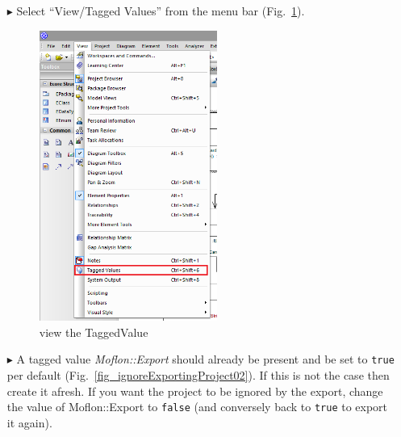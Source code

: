 \begin{enumerate}
\item[$\blacktriangleright$]Select ``View/Tagged Values'' from the menu bar (Fig.~\ref{fig_ignoreExportingProject01}).
\begin{figure}[htbp]
\begin{center}  \includegraphics[width=0.55\textwidth]{ignoreExportingProject1}
  \caption{view the TaggedValue}  
  \label{fig_ignoreExportingProject01}
\end{center}
\end{figure} 

\item[$\blacktriangleright$] A tagged value \emph{Moflon::Export} should already be present and be set to \texttt{true} per default
(Fig.~\ref{fig_ignoreExportingProject02}). If this is not the case then create it afresh. If you want the project to be ignored by the export, change the value
of Moflon::Export to \texttt{false} (and conversely back to \texttt{true} to export it again).


\end{enumerate}
